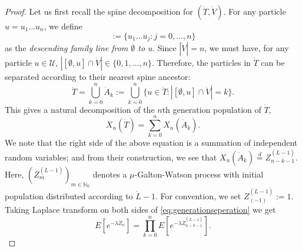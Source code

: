 \documentclass[12pt,a4paper]{amsart}
\numberwithin{equation}{section}
\begin{document}
\begin{proof}
	
	Let us first recall the spine decomposition for $(\dot T,\dot V)$.
	For any particle $u=u_1\dots u_n$, we define
\begin{equation*}
	[\emptyset, u]
	:= \{u_1\dots u_j:j=0,\dots, n \}
\end{equation*}
	as the \emph{descending family line from $\emptyset$ to $u$}.
	Since $|\dot V|=n$, we must have, for any particle $u\in\mathcal U$, $|[\emptyset, u]\cap\dot V|\in \{0,1,\dots,n\}$.
	Therefore, the particles in $\dot T$ can be separated according to their nearest spine ancestor:
\[
		\dot T
	=
		\bigcup_{k=0}^n\dot A_k
	:=
		\bigcup_{k=0}^n\{u\in\dot T:| [\emptyset, u] \cap \dot V |=k\}.
\]
	This gives a natural decomposition of the $n$th generation population of $\dot T$,
\begin{equation}
\label{eq:generationseperation}
		X_n(\dot T)
	=
		\sum_{k=0}^nX_n(\dot A_k).
\end{equation}
	We note that the right side of the above equation is a summation of independent random variables; 
	and from their construction, we see that $X_n(\dot A_k) \overset{d}= Z_{n-k-1}^{(\dot L - 1)}$.
	Here,  $(Z^{(\dot L - 1)}_m)_{m\in \mathbb N_0}$ denotes a $\mu$-Galton-Watson process %
	with initial population distributed according to $\dot L - 1$. 
	For convention, we set $Z^{(\dot L - 1)}_{(-1)}:= 1$.
	Taking Laplace transform on both sides of \eqref{eq:generationseperation} we get
\begin{equation} \label{eq: laplace transform of one-spine decomposition}
	E [e^{-\lambda \dot Z_n}] 
	= \prod_{k = 0}^n E[ e^{-\lambda Z^{(\dot L - 1)}_{n-k-1}} ].
\end{equation}
	

\end{proof}
\end{document}
